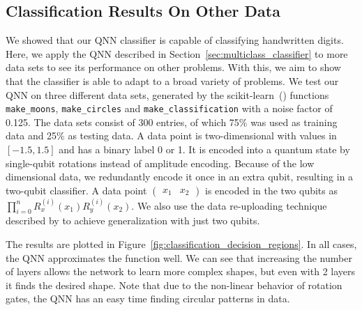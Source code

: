 \documentclass[a4paper,10pt]{article}
\begin{document}
\clearpage

\begin{appendices}
\section{Classification Results On Other Data} \label{sec:classification-other}
We showed that our QNN classifier is capable of classifying handwritten digits.
Here, we apply the QNN described in Section~\ref{sec:multiclass_classifier} to more data sets to see its performance on other problems.
With this, we aim to show that the classifier is able to adapt to a broad variety of problems.
We test our QNN on three different data sets, generated by the scikit-learn~(\cite{scikit-learn}) functions \verb|make_moons|, \verb|make_circles| and \verb|make_classification| with a noise factor of 0.125.
The data sets consist of 300 entries, of which 75\% was used as training data and 25\% as testing data.
A data point is two-dimensional with values in $[-1.5, 1.5]$ and has a binary label 0 or 1.
It is encoded into a quantum state by single-qubit rotations instead of amplitude encoding.
Because of the low dimensional data, we redundantly encode it once in an extra qubit, resulting in a two-qubit classifier.
A data point $(\begin{matrix}x_1 & x_2\end{matrix})$ is encoded in the two qubits as $\prod_{i=0}^{n}R_x^{(i)}(x_1)R_y^{(i)}(x_2)$.
We also use the data re-uploading technique described by \textcite{perez2019data} to achieve generalization with just two qubits.

The results are plotted in Figure~\ref{fig:classification_decision_regions}.
In all cases, the QNN approximates the function well.
We can see that increasing the number of layers allows the network to learn more complex shapes, but even with 2 layers it finds the desired shape.
Note that due to the non-linear behavior of rotation gates, the QNN has an easy time finding circular patterns in data.


\end{appendices}
\end{document}
